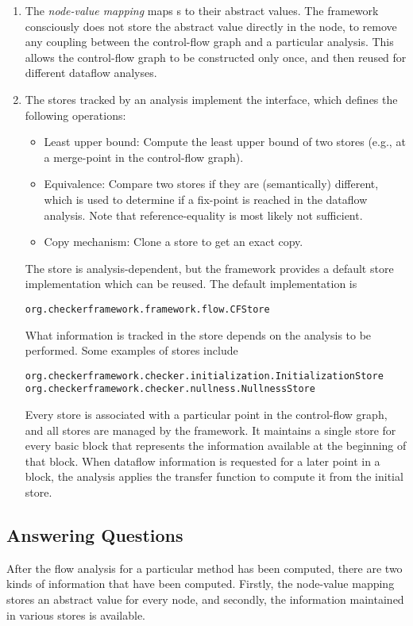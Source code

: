 \begin{enumerate}
\item
The \emph{node-value mapping} maps s to their abstract
values.  The framework consciously does not store the abstract value
directly in the node, to remove any coupling between the control-flow
graph and a particular analysis.  This allows the control-flow graph
to be constructed only once, and then reused for different dataflow
analyses.

\item
The stores tracked by an analysis implement the 
interface, which defines the following operations:
\begin{itemize}
\item Least upper bound: Compute the least upper bound of two stores
  (e.g., at a merge-point in the control-flow graph).
\item Equivalence: Compare two stores if they are (semantically)
  different, which is used to determine if a fix-point is reached in
  the dataflow analysis. Note that reference-equality is most likely
  not sufficient.
\item Copy mechanism: Clone a store to get an exact copy.
\end{itemize}
The store is analysis-dependent, but the framework provides a default
store implementation which can be reused.  The default implementation
is
\begin{verbatim}org.checkerframework.framework.flow.CFStore\end{verbatim}

What information is tracked in the store depends on the analysis to be
 performed.  Some examples of stores include
\begin{verbatim}
org.checkerframework.checker.initialization.InitializationStore
org.checkerframework.checker.nullness.NullnessStore
\end{verbatim}

Every store is associated with a particular point in the control-flow
graph, and all stores are managed by the framework. It maintains a
single store for every basic block that represents the information
available at the beginning of that block.  When dataflow information
is requested for a later point in a block, the analysis applies the
transfer function to compute it from the initial store.

\end{enumerate}


\subsection{Answering Questions}
\label{sec:answering-questions}
After the flow analysis for a particular method has been computed,
there are two kinds of information that have been computed.  Firstly,
the node-value mapping stores an abstract value for every node, and
secondly, the information maintained in various stores is available.

